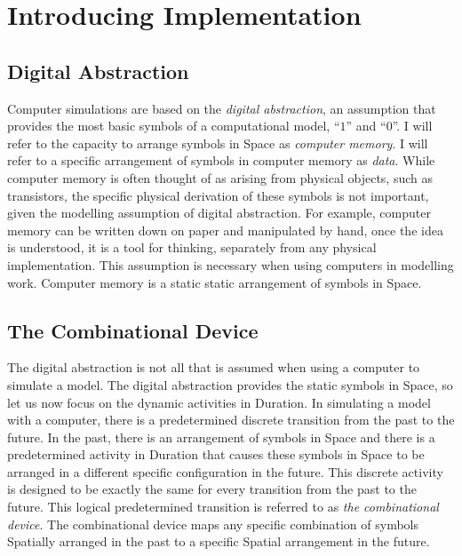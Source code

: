 \chapter{Introducing Implementation}
\label{chapter:introducing_implementation}

\section{Digital Abstraction}

Computer simulations are based on the \emph{digital abstraction}, an
assumption that provides the most basic symbols of a computational
model, ``$1$'' and ``$0$''.  I will refer to the capacity to arrange
symbols in Space as \emph{computer memory}.  I will refer to a
specific arrangement of symbols in computer memory as \emph{data}.
While computer memory is often thought of as arising from physical
objects, such as transistors, the specific physical derivation of
these symbols is not important, given the modelling assumption of
digital abstraction.  For example, computer memory can be written down
on paper and manipulated by hand, once the idea is understood, it is a
tool for thinking, separately from any physical implementation.  This
assumption is necessary when using computers in modelling work.
Computer memory is a static static arrangement of symbols in Space.

\section{The Combinational Device}

The digital abstraction is not all that is assumed when using a
computer to simulate a model.  The digital abstraction provides the
static symbols in Space, so let us now focus on the dynamic activities
in Duration.  In simulating a model with a computer, there is a
predetermined discrete transition from the past to the future.  In the
past, there is an arrangement of symbols in Space and there is a
predetermined activity in Duration that causes these symbols in Space
to be arranged in a different specific configuration in the future.
This discrete activity is designed to be exactly the same for every
transition from the past to the future.  This logical predetermined
transition is referred to as \emph{the combinational device}.  The
combinational device maps any specific combination of symbols
Spatially arranged in the past to a specific Spatial arrangement in
the future.


